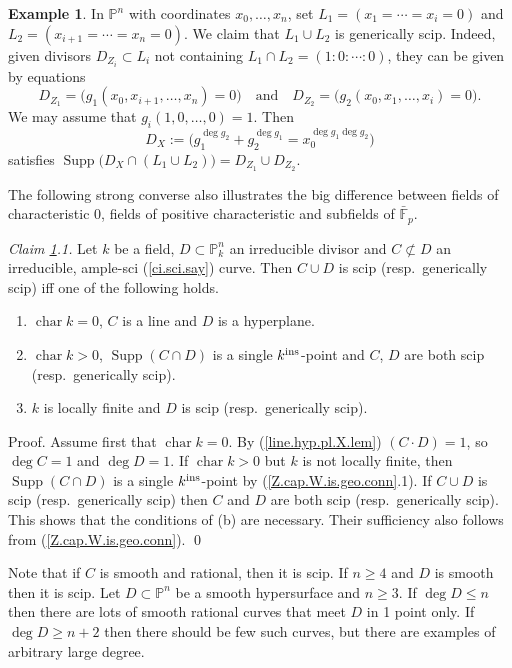 \documentclass{amsart}
\theoremstyle{definition}
\newtheorem{exmp}[thm]{Example}
\theoremstyle{remark}
\newcommand{\p}[0]{{\mathbb P}}
\newcommand{\f}[0]{{\mathbb F}}
\newcommand{\qtq}[1]{\quad\mbox{#1}\quad}
\newcommand{\supp}[0]{\operatorname{Supp}}
\newcommand{\chr}[0]{\operatorname{char}}
\begin{document}
\begin{exmp}\label{ci.defn.red.3.exmp}  
In $\p^n$ with coordinates $x_0,\dots, x_n$, set
$L_1=(x_1=\cdots=x_i=0)$ and $L_2=(x_{i+1}=\cdots=x_n=0)$. We claim that
$L_1\cup L_2$ is generically scip.  Indeed, given divisors $D_{Z_i}\subset L_i$ not containing
$L_1\cap L_2=(1{:}0{:}\cdots{:}0)$, they can be given by
equations
$$
D_{Z_1}=\bigl(g_1(x_0, x_{i+1},\dots,x_n)=0\bigr)\qtq{and}
D_{Z_2}=\bigl(g_2(x_0, x_{1},\dots,x_i)=0\bigr).
$$
We may assume that   $g_i(1,0,\dots, 0)=1$. Then
$$
D_X:=\bigl(g_1^{\deg g_2}+g_2^{\deg g_1}=x_0^{\deg g_1\deg g_2}\bigr)
$$
satisfies  $\supp \bigl(D_X\cap (L_1\cup L_2)\bigr)=D_{Z_1}\cup D_{Z_2}$.



The following  strong converse  also illustrates the big difference between fields of characteristic 0, fields of positive characteristic and subfields of $\bar\f_p$.

\medskip
{\it Claim \ref{ci.defn.red.3.exmp}.1.}   %
 Let $k$ be a field, $D\subset \p^n_k$ an irreducible divisor and $C\not\subset D$ an  irreducible, ample-sci  (\ref{ci.sci.say}) 
curve. Then
$C\cup D$ is scip (resp.\ generically scip) iff one of the following holds.
\begin{enumerate}
\item[(a)] $\chr k=0$, $C$ is a line and $D$ is a hyperplane.
\item[(b)]  $\chr k>0$, $\supp(C\cap D)$ is a single $k^{\rm ins}$-point and $C$, $D$ are both scip (resp.\ generically scip).
\item[(c)] $k$ is locally finite   and $D$ is scip (resp.\ generically scip).
\end{enumerate}

Proof.  Assume first that $\chr k=0$. By
(\ref{line.hyp.pl.X.lem})  $(C\cdot D)=1$, so $\deg C=1$ and $\deg D=1$. 
If  $\chr k>0$ but  $k$ is not locally finite, then 
 $\supp(C\cap D)$ is a single $k^{\rm ins}$-point by (\ref{Z.cap.W.is.geo.conn}.1). 
If $C\cup D$ is scip (resp.\ generically scip) then $C$ and $D$ are both scip (resp.\ generically scip). 
This shows that the conditions of (b) are necessary.
Their sufficiency also follows from (\ref{Z.cap.W.is.geo.conn}).
\qed

\medskip
Note that if $C$ is smooth and rational, then it is scip. If 
$n\geq 4$ and $D$ is smooth then it is scip.  
Let $D\subset \p^n$ be a smooth hypersurface and $n\geq 3$.
If $\deg D\leq n$ then there are  lots of smooth rational curves that meet $D$ in 1 point only.  If $\deg D\geq n+2$ then there should be few such curves, but there are  examples of arbitrary large degree. 
\end{exmp}
\end{document}
